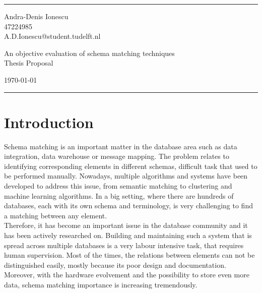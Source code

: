 \documentclass[a4paper]{article}
\begin{document}

\fancyhead[C]{}
\hrule \medskip %
\begin{minipage}{0.295\textwidth} 
\raggedright
\footnotesize
Andra-Denis Ionescu \hfill\\   
47224985 \hfill\\
A.D.Ionescu@student.tudelft.nl
\end{minipage}
\begin{minipage}{0.4\textwidth} 
\centering 
\large 
An objective evaluation of schema matching techniques\\ 
\normalsize 
Thesis Proposal\\ 
\end{minipage}
\begin{minipage}{0.295\textwidth} 
\raggedleft
\today\hfill\\
\end{minipage}
\medskip\hrule 
\bigskip


\section{Introduction}

Schema matching is an important matter in the database area such as data integration, data warehouse or message mapping. The problem relates to identifying corresponding elements in different schemas, difficult task that used to be performed manually. Nowadays, multiple algorithms and systems have been developed to address this issue, from semantic matching to clustering and machine learning algorithms. In a big setting, where there are hundreds of databases, each with its own schema and terminology, is very challenging to find a matching between any element. \\

Therefore, it has become an important issue in the database community and it has been actively researched on. Building and maintaining such a system that is spread across multiple databases is a very labour intensive task, that requires human supervision. Most of the times, the relations between elements can not be distinguished easily, mostly because its poor design and documentation. Moreover, with the hardware evolvement and the possibility to store even more data, schema matching importance is increasing tremendously. \\
\end{document}
